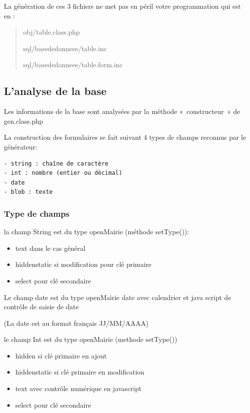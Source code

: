\documentclass[letterpaper,10pt,french]{manual}
\begin{document}
La génération de ces 3 fichiers ne met pas en péril votre programmation qui est en :
\begin{quote}

obj/table.class.php

sql/basededonnees/table.inc

sql/basededonnees/table.form.inc
\end{quote}

\resetcurrentobjects
\hypertarget{--doc-generateur/analyse_base}{}

\hypertarget{analyse-base}{}\subsection{L'analyse de la base}

Les informations de la base sont analysées par la méthode « constructeur » de gen.class.php

La construction des formulaires se fait suivant 4 types de champs reconnus par le générateur:

\begin{Verbatim}[commandchars=@\[\]]
- string : chaîne de caractère
- int : nombre (entier ou décimal)
- date
- blob : texte
\end{Verbatim}


\subsubsection{Type de champs}

la champ String est du type openMairie (méthode setType()):
\begin{itemize}
\item {} 
text dans le cas général

\item {} 
hiddenstatic si modification pour clé primaire

\item {} 
select pour clé secondaire

\end{itemize}

Le champ date est du type openMairie date avec calendrier et java script de contrôle de saisie de date

(La date est au format français JJ/MM/AAAA)

le champ Int est du type openMairie (methode setType())
\begin{itemize}
\item {} 
hidden si clé primaire en ajout

\item {} 
hiddenstatic si clé primaire en modification

\item {} 
text avec contrôle numérique en javascript

\item {} 
select pour clé secondaire

\end{itemize}
\end{document}
